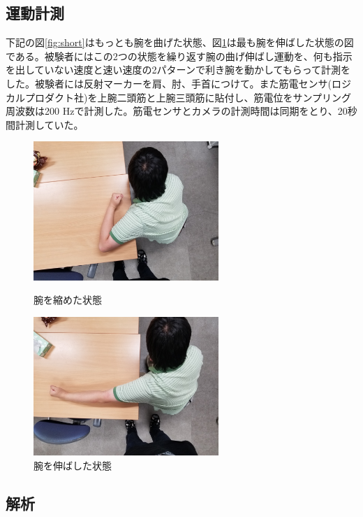 \documentclass{jsarticle}
\begin{document}
\subsection{運動計測}
下記の図\ref{fig:short}はもっとも腕を曲げた状態、図\ref{fig:long}は最も腕を伸ばした状態の図である。被験者にはこの2つの状態を繰り返す腕の曲げ伸ばし運動を、何も指示を出していない速度と速い速度の2パターンで利き腕を動かしてもらって計測をした。被験者には反射マーカーを肩、肘、手首につけて。また筋電センサ(ロジカルプロダクト社)を上腕二頭筋と上腕三頭筋に貼付し、筋電位をサンプリング周波数は200 Hzで計測した。筋電センサとカメラの計測時間は同期をとり、20秒間計測していた。
\begin{figure}[h]
  \begin{minipage}{0.5\hsize}
    \begin{center}
      \includegraphics[width=7cm]{images/short.jpg}
    \end{center}
    \caption{腕を縮めた状態}
    \label{fig:short}
  \end{minipage}
  \begin{minipage}{0.5\hsize}
    \begin{center}
      \includegraphics[width=7cm]{images/long.jpg}
    \end{center}
    \caption{腕を伸ばした状態}
    \label{fig:long}
  \end{minipage}
\end{figure}

\subsection{解析}
\end{document}
